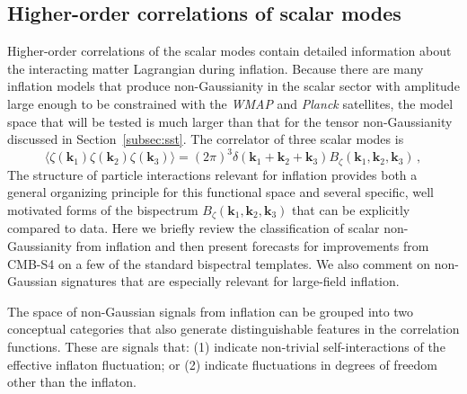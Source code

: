 \subsection{Higher-order correlations of scalar modes}
\label{subsec:scalarNG}
Higher-order correlations of the scalar modes contain detailed information about the interacting matter Lagrangian during inflation. Because there are many inflation models that produce non-Gaussianity in the scalar sector with amplitude large enough to be constrained with the {\it WMAP\/} and {\it Planck\/} satellites, the model space that will be tested is much larger than that for the tensor non-Gaussianity discussed in Section~\ref{subsec:sst}. The correlator of three scalar modes is
\begin{equation}
\label{eq:Bsss}
\langle\zeta(\mathbf{k}_1)\zeta(\mathbf{k}_2)\zeta(\mathbf{k}_3)\rangle=(2\pi)^3\delta(\mathbf{k}_1+\mathbf{k}_2+\mathbf{k}_3)B_{\zeta}(\mathbf{k}_1,\mathbf{k}_2,\mathbf{k}_3)\,,
\end{equation}
The structure of particle interactions relevant for inflation provides both a general organizing principle for this functional space and several specific, well motivated forms of the bispectrum $B_{\zeta}(\mathbf{k}_1,\mathbf{k}_2,\mathbf{k}_3)$ that can be explicitly compared to data. Here we briefly review the classification of scalar non-Gaussianity from inflation and then present forecasts for improvements from CMB-S4 on a few of the standard bispectral templates. We also comment on non-Gaussian signatures that are especially relevant for large-field inflation.

The space of non-Gaussian signals from inflation can be grouped into two conceptual categories that also generate distinguishable features in the correlation functions. These are signals that: (1) indicate non-trivial self-interactions of the effective inflaton fluctuation; or (2) indicate fluctuations in degrees of freedom other than the inflaton. 


